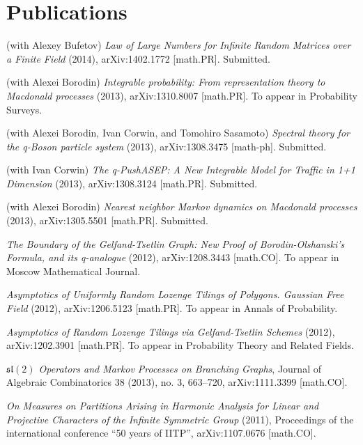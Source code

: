 \documentclass[letterpaper,11pt]{article}
\begin{document}
\section*{Publications}

\begin{etaremune}
    \renewcommand{\labelenumi}{[\theenumi]}
    \item (with Alexey Bufetov)
    \emph{Law of Large Numbers for Infinite Random Matrices over a Finite Field} (2014), arXiv:1402.1772 [math.PR].
    Submitted.
    \item (with Alexei Borodin) 
    \emph{Integrable probability: From representation theory to Macdonald processes}
    (2013), arXiv:1310.8007 [math.PR]. To appear in Probability Surveys.
    \item (with Alexei Borodin, Ivan Corwin, and Tomohiro Sasamoto)
    \emph{Spectral theory for the q-Boson particle system}
    (2013), arXiv:1308.3475 [math-ph]. Submitted.
    \item (with Ivan Corwin)
    \emph{The q-PushASEP: A New Integrable Model for Traffic in 1+1 Dimension} (2013), arXiv:1308.3124 [math.PR]. 
    Submitted.
    \item (with Alexei Borodin) 
    \emph{Nearest neighbor Markov dynamics on Macdonald processes} (2013), 
    arXiv:1305.5501 [math.PR].
    Submitted.
    \item \emph{The Boundary of the Gelfand-Tsetlin Graph: New Proof of Borodin-Olshanski's Formula, and its q-analogue} (2012),  arXiv:1208.3443 [math.CO]. To appear in Moscow Mathematical Journal.
    \item \emph{Asymptotics of Uniformly Random Lozenge Tilings of Polygons. Gaussian Free Field} (2012), arXiv:1206.5123 [math.PR]. To appear in Annals of Probability.
    \item \emph{Asymptotics of Random Lozenge Tilings via Gelfand-Tsetlin Schemes} (2012), arXiv:1202.3901 [math.PR]. To
    appear in Probability Theory and Related Fields.
    \item \emph{$\mathfrak{sl}(2)$ Operators and Markov Processes on Branching Graphs},
    Journal of Algebraic Combinatorics 38 (2013), no. 3, 663--720,
    arXiv:1111.3399 [math.CO].
    \item \emph{On Measures on Partitions Arising in Harmonic Analysis for Linear and Projective Characters of the Infinite Symmetric Group} (2011), Proceedings of the international conference ``50 years of IITP'', arXiv:1107.0676 [math.CO].

\end{etaremune}
\end{document}
